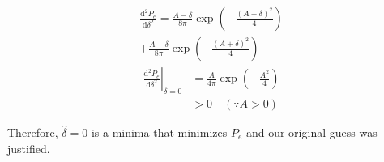 \documentclass[journal,12pt,twocolumn]{IEEEtran}
\providecommand{\brak}[1]{\ensuremath{\left(#1\right)}}
\providecommand{\der}[1]{\mathrm{d} #1}
\numberwithin{equation}{section}
\renewcommand\thesection{\arabic{section}}
\begin{document}
\begin{enumerate}[label=\thesection.\arabic*,ref=\thesection.\theenumi]
	\begin{multline}
		\frac{\mathrm{d}^2 P_e}{\der{\delta^2}} = \frac{A-\delta}{8\pi} \exp\brak{-\frac{(A-\delta)^2}{4}} \\
		+ \frac{A+\delta}{8\pi} \exp\brak{-\frac{(A+\delta)^2}{4}}
	\end{multline}
	\begin{align}
		\left. \frac{\mathrm{d}^2 P_e}{\der{\delta^2}} \right|_{\delta=0} &= \frac{A}{4\pi} \exp\brak{-\frac{A^2}{4}} \\
		&> 0 \quad (\because A > 0)
	\end{align}
	
	Therefore, $\hat{\delta} = 0$ is a minima that minimizes $P_e$ and our original guess was justified.
	\end{enumerate}
\end{document}
